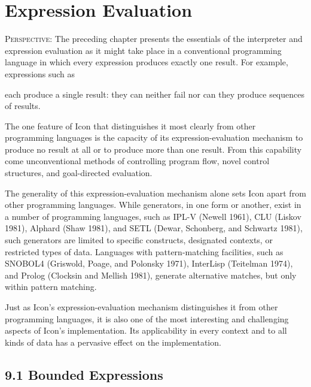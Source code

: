 \chapter{Expression Evaluation}

\textsc{Perspective}: The preceding chapter presents the essentials of
the interpreter and expression evaluation as it might take place in a
conventional programming language in which every expression produces
exactly one result. For example, expressions such as


\noindent each produce a single result: they can neither fail nor can
they produce sequences of results.

The one feature of Icon that distinguishes it most clearly from other
programming languages is the capacity of its expression-evaluation
mechanism to produce no result at all or to produce more than one
result. From this capability come unconventional methods of
controlling program flow, novel control structures, and goal-directed
evaluation.

The generality of this expression-evaluation mechanism alone sets Icon
apart from other programming languages. While generators, in one form
or another, exist in a number of programming languages, such as IPL-V
(Newell 1961), CLU (Liskov 1981), Alphard (Shaw 1981), and SETL
(Dewar, Schonberg, and Schwartz 1981), such generators are limited to
specific constructs, designated contexts, or restricted types of
data. Languages with pattern-matching facilities, such as SNOBOL4
(Griswold, Poage, and Polonsky 1971), InterLisp (Teitelman 1974), and
Prolog (Clocksin and Mellish 1981), generate alternative matches, but
only within pattern matching.

Just as Icon's expression-evaluation mechanism distinguishes it from
other programming languages, it is also one of the most interesting
and challenging aspects of Icon's implementation. Its applicability in
every context and to all kinds of data has a pervasive effect on the
implementation.


\section[9.1 Bounded Expressions]{9.1 Bounded Expressions}

